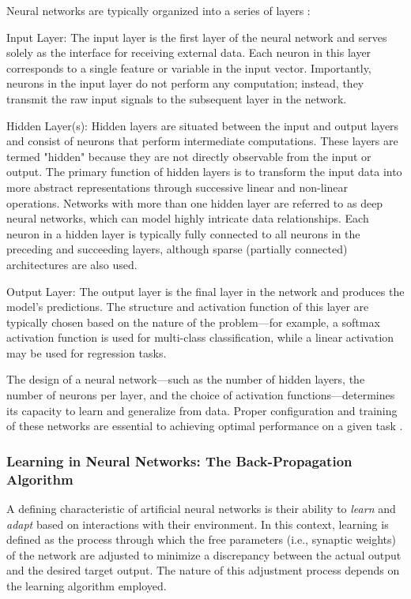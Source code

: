 Neural networks are typically organized into a series of layers \parencite[p.~4]{mienye2024nncomprehensivereview}:

Input Layer: The input layer is the first layer of the neural network and serves solely as the interface for receiving external data. Each neuron in this layer corresponds to a single feature or variable in the input vector. Importantly, neurons in the input layer do not perform any computation; instead, they transmit the raw input signals to the subsequent layer in the network.

Hidden Layer(s): Hidden layers are situated between the input and output layers and consist of neurons that perform intermediate computations. These layers are termed "hidden" because they are not directly observable from the input or output. The primary function of hidden layers is to transform the input data into more abstract representations through successive linear and non-linear operations. Networks with more than one hidden layer are referred to as deep neural networks, which can model highly intricate data relationships. Each neuron in a hidden layer is typically fully connected to all neurons in the preceding and succeeding layers, although sparse (partially connected) architectures are also used.

Output Layer: The output layer is the final layer in the network and produces the model's predictions. The structure and activation function of this layer are typically chosen based on the nature of the problem—for example, a softmax activation function is used for multi-class classification, while a linear activation may be used for regression tasks.

The design of a neural network—such as the number of hidden layers, the number of neurons per layer, and the choice of activation functions—determines its capacity to learn and generalize from data. Proper configuration and training of these networks are essential to achieving optimal performance on a given task \parencite{sazli2006feedforwardnn}.

\subsubsection{Learning in Neural Networks: The Back-Propagation Algorithm}

A defining characteristic of artificial neural networks is their ability to \textit{learn} and \textit{adapt} based on interactions with their environment. In this context, learning is defined as the process through which the free parameters (i.e., synaptic weights) of the network are adjusted to minimize a discrepancy between the actual output and the desired target output. The nature of this adjustment process depends on the learning algorithm employed.

